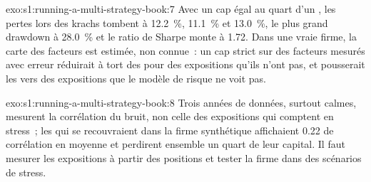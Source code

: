 \begin{solution}{exo:s1:running-a-multi-strategy-book:7}
Avec un cap égal au quart d'un , les pertes lors des krachs tombent à 12.2~\%, 11.1~\% et 13.0~\%, le plus grand drawdown à 28.0~\% et le ratio de Sharpe monte à 1.72.
Dans une vraie firme, la carte des facteurs est estimée, non connue~: un cap strict sur des facteurs mesurés avec erreur réduirait à tort des  pour des expositions qu'ils n'ont pas, et
pousserait les  vers des expositions que le modèle de risque ne voit pas.
\end{solution}

\begin{solution}{exo:s1:running-a-multi-strategy-book:8}
Trois années de données, surtout calmes, mesurent la corrélation du bruit, non celle des expositions qui comptent en stress~; les  qui se recouvraient dans la firme synthétique affichaient
0.22 de corrélation en moyenne et perdirent ensemble un quart de leur capital. Il faut mesurer les expositions à partir des positions et tester la firme dans des scénarios de stress.
\end{solution}

